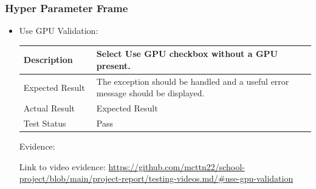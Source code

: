 \documentclass[./project-report/src/latex/project-report.tex]{subfiles}
\begin{document}
\subsubsection{Hyper Parameter Frame}
\label{sec:hyper-parameter-frame-input-validation}
\begin{itemize}
	\item Use GPU Validation: \newline\newline
		\begin{tabular}{|p{0.25\linewidth}|p{0.75\linewidth}|}
			\hline
			Description & Select Use GPU checkbox without a GPU present. \\
			\hline
			Expected Result & The exception should be handled and a useful error message should be displayed. \\
			\hline
			Actual Result & Expected Result \\
			\hline
			Test Status & Pass \\
			\hline
		\end{tabular}

		\vspace{5mm}

		Evidence:
		\begin{figure}[h!]
		\centering
		\end{figure}

		Link to video evidence: \url{https://github.com/mcttn22/school-project/blob/main/project-report/testing-videos.md/#use-gpu-validation}

	\pagebreak


\end{itemize}
\end{document}
